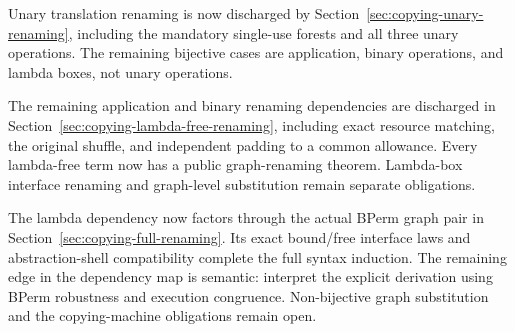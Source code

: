 Unary translation renaming is now discharged by
Section~\ref{sec:copying-unary-renaming}, including the mandatory single-use
forests and all three unary operations. The remaining bijective cases are
application, binary operations, and lambda boxes, not unary operations.


The remaining application and binary renaming dependencies are discharged in
Section~\ref{sec:copying-lambda-free-renaming}, including exact resource matching,
the original shuffle, and independent padding to a common allowance. Every
lambda-free term now has a public graph-renaming theorem. Lambda-box interface
renaming and graph-level substitution remain separate obligations.


The lambda dependency now factors through the actual BPerm graph pair in
Section~\ref{sec:copying-full-renaming}. Its exact bound/free interface laws and
abstraction-shell compatibility complete the full syntax induction. The remaining
edge in the dependency map is semantic: interpret the explicit derivation using
BPerm robustness and execution congruence. Non-bijective graph substitution and
the copying-machine obligations remain open.

